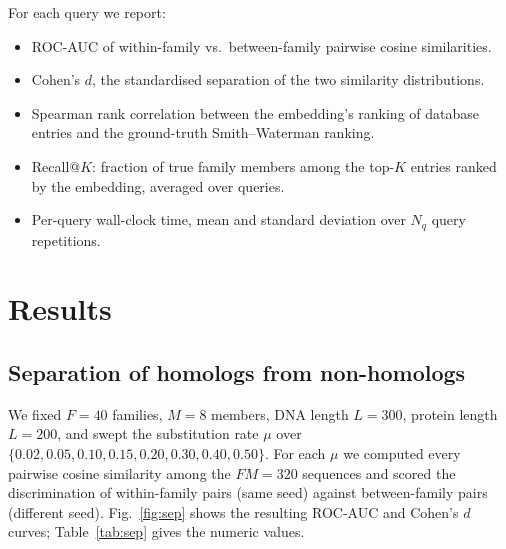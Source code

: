 \documentclass[twocolumn,11pt,a4paper]{article}
\theoremstyle{definition}
\theoremstyle{remark}
\begin{document}
For each query we report:
\begin{itemize}
    \item ROC-AUC of within-family vs.\ between-family pairwise cosine
    similarities.
    \item Cohen's $d$, the standardised separation of the two
    similarity distributions.
    \item Spearman rank correlation between the embedding's ranking of
    database entries and the ground-truth Smith--Waterman ranking.
    \item Recall@$K$: fraction of true family members among the top-$K$
    entries ranked by the embedding, averaged over queries.
    \item Per-query wall-clock time, mean and standard deviation over
    $N_q$ query repetitions.
\end{itemize}

\section{Results}
\label{sec:exp}

\subsection{Separation of homologs from non-homologs}
\label{sec:exp:sep}

We fixed $F = 40$ families, $M = 8$ members, DNA length $L = 300$, protein
length $L = 200$, and swept the substitution rate $\mu$ over
$\{0.02, 0.05, 0.10, 0.15, 0.20, 0.30, 0.40, 0.50\}$. For each $\mu$ we
computed every pairwise cosine similarity among the $FM = 320$ sequences
and scored the discrimination of within-family pairs (same seed) against
between-family pairs (different seed). Fig.~\ref{fig:sep} shows the
resulting ROC-AUC and Cohen's $d$ curves; Table~\ref{tab:sep} gives the
numeric values.
\end{document}
